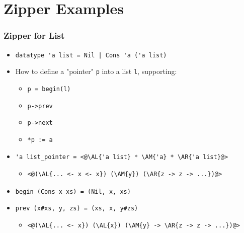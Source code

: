 \section{Zipper Examples}

\begin{frame}
\frametitle{Zipper for List}

\begin{itemize}
\item \lstinline.datatype 'a list = Nil | Cons 'a ('a list).

\item How to define a "pointer" \lstinline|p| into a list \lstinline|l|, supporting:
\begin{itemize}
	\item \lstinline|p = begin(l)|
	\item \lstinline|p->prev|
	\item \lstinline|p->next|
	\item \lstinline|*p := a|
\end{itemize}
\end{itemize}

\framebreak

\begin{itemize}
\newcommand{\AL}[1]{\textcolor{red}{#1}}
\newcommand{\AM}[1]{\textcolor{green}{#1}}
\newcommand{\AR}[1]{\textcolor{blue}{#1}}
\item
\begin{lstlisting}
'a list_pointer = <@\AL{'a list} * \AM{'a} * \AR{'a list}@>
\end{lstlisting}
\begin{itemize}
	\item
\begin{lstlisting}
<@(\AL{... <- x <- x}) (\AM{y}) (\AR{z -> z -> ...})@>
\end{lstlisting}
\end{itemize}

\item \lstinline.begin (Cons x xs) = (Nil, x, xs).

\item \lstinline.prev (x#xs, y, zs) = (xs, x, y#zs).
\begin{itemize}
	\item
\begin{lstlisting}
<@(\AL{... <- x}) (\AL{x}) (\AM{y} -> \AR{z -> z -> ...})@>
\end{lstlisting}
\end{itemize}


\end{itemize}
\end{frame}
